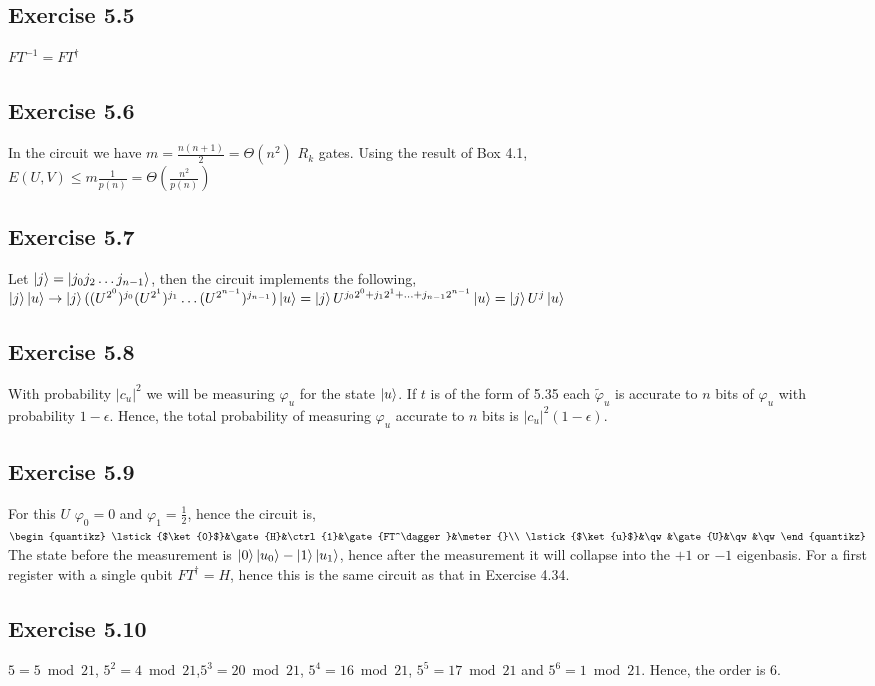 \documentclass[a4paper,12pt]{article}
\begin{document}
\subsection*{Exercise 5.5}
$FT^{-1}=FT^\dagger$
\subsection*{Exercise 5.6}
In the circuit we have $m=\frac{n(n+1)}{2}=\Theta(n^2)$ $R_k$ gates. Using the result of Box 4.1,\\
$E(U,V)\leq m\frac{1}{p(n)}=\Theta(\frac{n^2}{p(n)})$
\subsection*{Exercise 5.7}
Let $\ket{j}=\ket{j_0j_2\ldots j_{n-1}}$, then the circuit implements the following,\\
$\ket{j}\ket{u}\rightarrow \ket{j}((U^{2^0})^{j_0}(U^{2^1})^{j_1}\ldots(U^{2^{n-1}})^{j_{n-1}})\ket{u}=
\ket{j}U^{j_02^0+j_12^1+\ldots+j_{n-1}2^{n-1}}\ket{u}=\ket{j}U^j\ket{u}$
\subsection*{Exercise 5.8}
With probability $|c_u|^2$ we will be measuring $\varphi_u$ for the state $\ket{u}$.
If $t$ is of the form of 5.35 each $\tilde{\varphi}_u$ is accurate to $n$ bits of $\varphi_u$ with
probability $1-\epsilon$. Hence, the total probability of measuring $\varphi_u$ accurate to $n$ bits
is $|c_u|^2(1-\epsilon)$.
\subsection*{Exercise 5.9}
For this $U$ $\varphi_0=0$ and $\varphi_1=\frac{1}{2}$, hence the circuit is,\\
$\begin{quantikz}
    \lstick{$\ket{0}$}&\gate{H}&\ctrl{1}&\gate{FT^\dagger}&\meter{}\\
    \lstick{$\ket{u}$}&\qw&\gate{U}&\qw&\qw
\end{quantikz}$
The state before the measurement is $\ket{0}\ket{u_0}-\ket{1}\ket{u_1}$, hence after the
measurement it will collapse into the $+1$ or $-1$ eigenbasis. For a first register with a
single qubit $FT^\dagger=H$, hence this is the same circuit as that in Exercise 4.34.
\subsection*{Exercise 5.10}
$5=5\bmod 21$, $5^2=4\bmod 21$,$5^3=20\bmod 21$, $5^4=16\bmod 21$, $5^5=17\bmod 21$ and
$5^6=1\bmod 21$. Hence, the order is $6$. 
\end{document}
